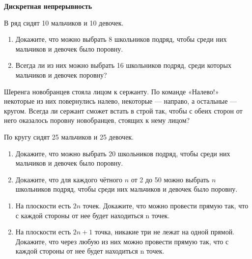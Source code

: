 \documentclass{article}
\begin{document}
    \large

    \begin{center}
        \textbf{Дискретная непрерывность}
    \end{center}

    \begin{enumerate_boxed}

        \setcounter{enumi}{-1}

        \item В ряд сидят 10 мальчиков и 10 девочек.


        \begin{enumerate}
            \item Докажите, что можно выбрать 8 школьников подряд, чтобы среди них мальчиков и девочек
            было поровну.

            \item Всегда ли из них можно выбрать 16 школьников подряд, среди которых мальчиков и девочек поровну?
        \end{enumerate}

        \item Шеренга новобранцев стояла лицом к сержанту.
        По команде «Налево!» некоторые из них повернулись налево, некоторые — направо, а остальные — кругом.
        Всегда ли сержант сможет встать в строй так, чтобы с обеих сторон от него оказалось поровну новобранцев, стоящих к нему лицом?

        \item По кругу сидят 25 мальчиков и 25 девочек.

        \begin{enumerate}
            \item Докажите, что можно выбрать 20 школьников подряд, чтобы среди них мальчиков и девочек
            было поровну.

            \item Докажите, что для каждого чётного $n$ от 2 до 50 можно выбрать $n$ школьников подряд, чтобы среди них мальчиков и девочек было поровну.
        \end{enumerate}

        \item

        \begin{enumerate}
            \item На плоскости есть $2n$ точек.
            Докажите, что можно провести прямую так, что с каждой стороны от нее будет находиться n точек.

            \item На плоскости есть $2n + 1$ точка, никакие три не лежат на одной прямой.
            Докажите, что через любую из них можно провести прямую так, что с каждой стороны от нее будет находиться n точек.
        \end{enumerate}


\end{enumerate_boxed}
\end{document}

